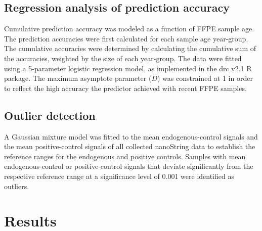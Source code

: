 \subsection{Regression analysis of prediction accuracy}

Cumulative prediction accuracy was modeled as a function of FFPE sample age. The prediction accuracies were first calculated for each sample age year-group. The cumulative accuracies were determined by calculating the cumulative sum of the accuracies, weighted by the size of each year-group. The data were fitted using a 5-parameter logistic regression model, as implemented in the drc v2.1 R package. The maximum asymptote parameter ($D$) was constrained at 1 in order to reflect the high accuracy the predictor achieved with recent FFPE samples.

\subsection{Outlier detection}

A Gaussian mixture model was fitted to the mean endogenous-control signals and the mean positive-control signals of all collected nanoString data to establish the reference ranges for the endogenous and positive controls. Samples with mean endogenous-control or positive-control signals that deviate significantly from the respective reference range at a significance level of 0.001 were identified as outliers.

\section{Results}

